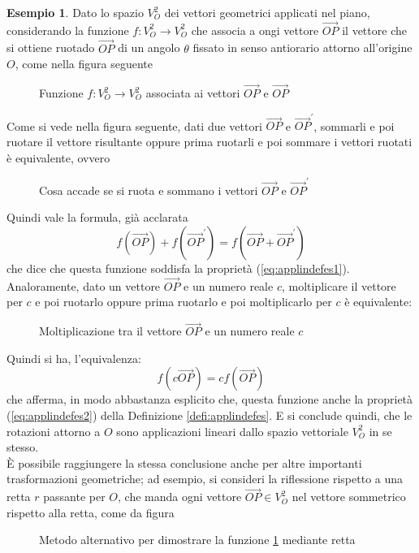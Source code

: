 \documentclass{book}
\theoremstyle{definition}
\newtheorem{es}{Esempio}[section]
\theoremstyle{plain}
\begin{document}
\begin{es}
  \label{es:applindefes1}
  Dato lo spazio $V_O^2$ dei vettori geometrici applicati nel piano,
  considerando la funzione $f:V_O^2\to V_O^2$ che associa a ongi vettore
  $\vec{OP}$ il vettore che si ottiene ruotado $\vec{OP}$ di un angolo
  $\theta$ fissato in senso antiorario attorno all'origine $O$, come
  nella figura seguente
  \begin{figure}[ht!]
    \centering
    \resizebox{4cm}{!}{}
    \caption{Funzione $f:V_O^2\to V_O^2$ associata ai vettori $\vec{OP}$ e $\vec{OP}$}
    \label{fig:applindefes1}
  \end{figure}
  
  Come si vede nella figura seguente, dati due vettori $\vec{OP}$ e
  $\vec{OP}^\prime$, sommarli e poi ruotare il vettore risultante oppure
  prima ruotarli e poi sommare i vettori ruotati è equivalente, ovvero
  \clearpage
  \begin{figure}[ht!]
    \centering
    \resizebox{7cm}{!}{}
    \caption{Cosa accade se si ruota e sommano i vettori $\vec{OP}$ e $\vec{OP}^\prime$}
    \label{fig:applindefes2}
  \end{figure}
  Quindi vale la formula, già acclarata
  \begin{equation}
    \label{eq:applindefes3}
    f(\vec{OP})+f(\vec{OP}^\prime)=f(\vec{OP}+\vec{OP}^\prime)
  \end{equation}
  che dice che questa funzione soddisfa la proprietà
  (\ref{eq:applindefes1}). Analoramente, dato un vettore $\vec{OP}$ e un
  numero reale $c$, moltiplicare il vettore per $c$ e poi ruotarlo oppure
  prima ruotarlo e poi moltiplicarlo per $c$ è equivalente:
  \begin{figure}[ht!]
    \centering
    \resizebox{5cm}{!}{}
    \caption{Moltiplicazione tra il vettore $\vec{OP}$ e un numero reale $c$}
    \label{fig:applindefes3}
  \end{figure}
  
  Quindi si ha, l'equivalenza:
  \begin{equation}
    \label{eq:applindefes4}
    f(c\vec{OP})=cf(\vec{OP})
  \end{equation}
  che afferma, in modo abbastanza esplicito che, questa funzione anche
  la proprietà (\ref{eq:applindefes2}) della Definizione
  \ref{defi:applindefes}. E si conclude quindi, che le rotazioni attorno
  a $O$ sono applicazioni lineari dallo spazio vettoriale $V_O^2$ in se
  stesso.\\
  È possibile raggiungere la stessa conclusione anche per altre importanti
  trasformazioni geometriche; ad esempio, si consideri la riflessione
  rispetto a una retta $r$ passante per $O$, che manda ogni vettore
  $\vec{OP}\in V_O^2$ nel vettore sommetrico rispetto alla retta, come
  da figura
  \begin{figure}[ht!]
    \centering
    \resizebox{5cm}{!}{}
    \caption{Metodo alternativo per dimostrare la funzione
      \ref{fig:applindefes1} mediante retta}
    \label{fig:applindefes4}
  \end{figure}


\end{es}
\end{document}
